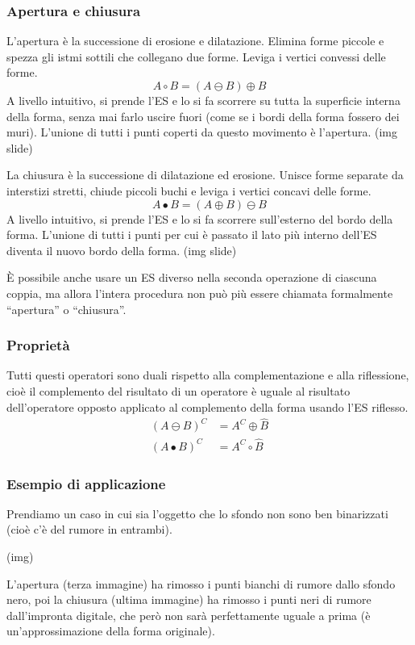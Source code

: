 \documentclass[a4paper,11pt]{article}
\begin{document}
\subsubsection{Apertura e chiusura}
L'apertura è la successione di erosione e dilatazione. Elimina forme piccole e spezza gli istmi sottili che collegano due forme. Leviga i vertici
convessi delle forme.
\[
A \circ B = (A \ominus B) \oplus B
\]
A livello intuitivo, si prende l'ES e lo si fa scorrere su tutta la superficie interna della forma, senza mai farlo uscire fuori (come
se i bordi della forma fossero dei muri). L'unione di tutti i punti coperti da questo movimento è l'apertura. (img slide)
\par
La chiusura è la successione di dilatazione ed erosione. Unisce forme separate da interstizi stretti, chiude piccoli buchi e leviga i vertici concavi delle forme.
\[
A \bullet B = (A \oplus B) \ominus B
\]
A livello intuitivo, si prende l'ES e lo si fa scorrere sull'esterno del bordo della forma. L'unione di tutti i punti per cui è passato il lato più
interno dell'ES diventa il nuovo bordo della forma. (img slide)
\par
È possibile anche usare un ES diverso nella seconda operazione di ciascuna coppia, ma allora l'intera procedura non può più
essere chiamata formalmente ``apertura'' o ``chiusura''.

\subsubsection{Proprietà}
Tutti questi operatori sono duali rispetto alla complementazione e alla riflessione, cioè il complemento del risultato di un operatore
è uguale al risultato dell'operatore opposto applicato al complemento della forma usando l'ES riflesso.
\begin{align*}
    (A \ominus B)^C &= A^C \oplus \hat{B} \\
    (A \bullet B)^C &= A^C \circ \hat{B}
\end{align*}

\subsubsection{Esempio di applicazione}
Prendiamo un caso in cui sia l'oggetto che lo sfondo non sono ben binarizzati (cioè c'è del rumore in entrambi).
\par
(img)
\par
L'apertura (terza immagine) ha rimosso i punti bianchi di rumore dallo sfondo nero, poi la chiusura (ultima immagine) ha rimosso i punti
neri di rumore dall'impronta digitale, che però non sarà perfettamente uguale a prima (è un'approssimazione della forma originale).
\end{document}
